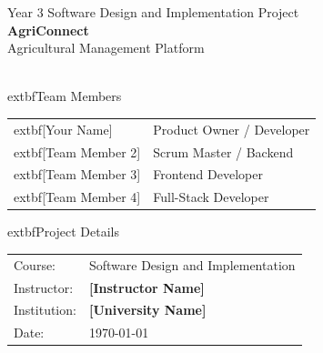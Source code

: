 \documentclass[12pt,a4paper]{article}
\begin{document}
\hypersetup{pageanchor=false}

\begin{titlepage}
    \centering
    \vspace*{1.5cm}
    {\Large \textcolor{AgriAccent}{Year 3 Software Design and Implementation Project}}\\[0.8cm]
    {\Huge \textbf{\textcolor{AgriPrimary}{AgriConnect}}}\\[0.2cm]
    {\Large Agricultural Management Platform}\\[0.8cm]

    \setlength{\fboxsep}{12pt}
    \noindent{}\\[1.4cm]

    \begin{minipage}{0.48\textwidth}
        	extbf{Team Members}\\[0.3cm]
        \begin{tabularx}{\linewidth}{@{}l>{\raggedright\arraybackslash}X@{}}
            	extbf{[Your Name]} & Product Owner / Developer \\
            	extbf{[Team Member 2]} & Scrum Master / Backend \\
            	extbf{[Team Member 3]} & Frontend Developer \\
            	extbf{[Team Member 4]} & Full-Stack Developer \\
        \end{tabularx}
    \end{minipage}
    \hfill
    \begin{minipage}{0.43\textwidth}
        	extbf{Project Details}\\[0.3cm]
        \begin{tabularx}{\linewidth}{@{}l>{\raggedright\arraybackslash}X@{}}
            Course: & Software Design and Implementation \\
            Instructor: & \textbf{[Instructor Name]} \\
            Institution: & \textbf{[University Name]} \\
            Date: & \today \\
        \end{tabularx}
    \end{minipage}

    \vfill

    \noindent{}

    \end{titlepage}
    \clearpage
    \hypersetup{pageanchor=true}
\end{document}
